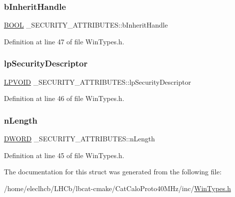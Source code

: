 \subsubsection{\texorpdfstring{b\+Inherit\+Handle}{bInheritHandle}}
{\footnotesize\ttfamily \hyperlink{CatCaloProto40MHz_2inc_2WinTypes_8h_a050c65e107f0c828f856a231f4b4e788}{B\+O\+OL} \+\_\+\+S\+E\+C\+U\+R\+I\+T\+Y\+\_\+\+A\+T\+T\+R\+I\+B\+U\+T\+E\+S\+::b\+Inherit\+Handle}



Definition at line 47 of file Win\+Types.\+h.

\mbox{\label{struct__SECURITY__ATTRIBUTES_a90d1d49f7d2d50b24cc74c5060ae6204}} 
\subsubsection{\texorpdfstring{lp\+Security\+Descriptor}{lpSecurityDescriptor}}
{\footnotesize\ttfamily \hyperlink{CatCaloProto40MHz_2inc_2WinTypes_8h_a98428a03b263db9d26c25c53459c542f}{L\+P\+V\+O\+ID} \+\_\+\+S\+E\+C\+U\+R\+I\+T\+Y\+\_\+\+A\+T\+T\+R\+I\+B\+U\+T\+E\+S\+::lp\+Security\+Descriptor}



Definition at line 46 of file Win\+Types.\+h.

\mbox{\label{struct__SECURITY__ATTRIBUTES_a3ec25c40b65a92b164177b0b230abda9}} 
\subsubsection{\texorpdfstring{n\+Length}{nLength}}
{\footnotesize\ttfamily \hyperlink{CatCaloProto40MHz_2inc_2WinTypes_8h_ad342ac907eb044443153a22f964bf0af}{D\+W\+O\+RD} \+\_\+\+S\+E\+C\+U\+R\+I\+T\+Y\+\_\+\+A\+T\+T\+R\+I\+B\+U\+T\+E\+S\+::n\+Length}



Definition at line 45 of file Win\+Types.\+h.



The documentation for this struct was generated from the following file\+:\begin{DoxyCompactItemize}
\item 
/home/eleclhcb/\+L\+H\+Cb/lbcat-\/cmake/\+Cat\+Calo\+Proto40\+M\+Hz/inc/\hyperlink{CatCaloProto40MHz_2inc_2WinTypes_8h}{Win\+Types.\+h}\end{DoxyCompactItemize}
